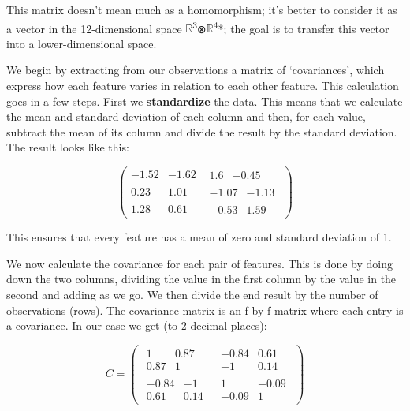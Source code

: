 \documentclass[oneside,english]{amsbook}
\numberwithin{section}{chapter}
\theoremstyle{plain}
\theoremstyle{definition}
\begin{document}
This matrix doesn't mean much as a homomorphism; it's better to consider
it as a vector in the 12-dimensional space
$\mathbb{R}$\textsuperscript{3}⊗$\mathbb{R}$\textsuperscript{4}*; the goal
is to transfer this vector into a lower-dimensional space.

We begin by extracting from our observations a matrix of
`covariances', which express how each feature varies in relation to
each other feature. This calculation goes in a few steps. First we
\textbf{standardize} the data. This means that we calculate the mean and
standard deviation of each column and then, for each value, subtract the
mean of its column and divide the result by the standard deviation. The
result looks like this:

\[\begin{pmatrix}
	- 1.52 & - 1.62 & \begin{matrix}
		1.6 & - 0.45
	\end{matrix} \\
	0.23 & 1.01 & \begin{matrix}
		- 1.07 & - 1.13
	\end{matrix} \\
	1.28 & 0.61 & \begin{matrix}
		- 0.53 & 1.59
	\end{matrix}
\end{pmatrix}\]

This ensures that every feature has a mean of zero and standard
deviation of 1.

We now calculate the covariance for each pair of features. This is done
by doing down the two columns, dividing the value in the first column by
the value in the second and adding as we go. We then divide the end
result by the number of observations (rows). The covariance matrix is an
f-by-f matrix where each entry is a covariance. In our case we get (to 2
decimal places):

\[C = \begin{pmatrix}
	\begin{matrix}
		1 & 0.87 \\
		0.87 & 1
	\end{matrix} & \begin{matrix}
		- 0.84 & 0.61 \\
		- 1 & 0.14
	\end{matrix} \\
	\begin{matrix}
		- 0.84 & - 1 \\
		0.61 & 0.14
	\end{matrix} & \begin{matrix}
		1 & - 0.09 \\
		- 0.09 & 1
	\end{matrix}
\end{pmatrix}\]
\end{document}
